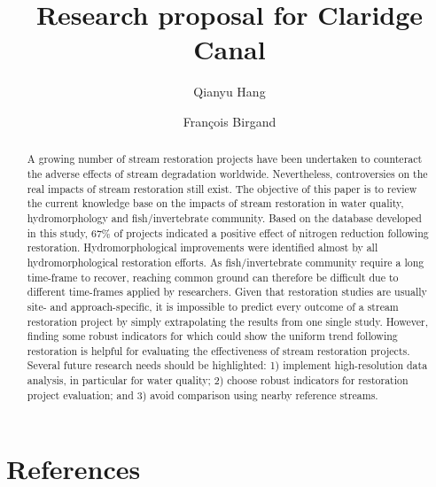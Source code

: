 \documentclass[]{elsarticle} %
\begin{document}
\begin{frontmatter}

  \title{Research proposal for Claridge Canal}
    \author[NC State University]{Qianyu Hang}
  
    \author[NC State University]{François Birgand}
      \address[NC State University]{Biological and Agricultural Engineering, Capus Box 7625, Raleigh, NC,
27695}
  
  \begin{abstract}
  A growing number of stream restoration projects have been undertaken to
  counteract the adverse effects of stream degradation worldwide.
  Nevertheless, controversies on the real impacts of stream restoration
  still exist. The objective of this paper is to review the current
  knowledge base on the impacts of stream restoration in water quality,
  hydromorphology and fish/invertebrate community. Based on the database
  developed in this study, 67\% of projects indicated a positive effect of
  nitrogen reduction following restoration. Hydromorphological
  improvements were identified almost by all hydromorphological
  restoration efforts. As fish/invertebrate community require a long
  time-frame to recover, reaching common ground can therefore be difficult
  due to different time-frames applied by researchers. Given that
  restoration studies are usually site- and approach-specific, it is
  impossible to predict every outcome of a stream restoration project by
  simply extrapolating the results from one single study. However, finding
  some robust indicators for which could show the uniform trend following
  restoration is helpful for evaluating the effectiveness of stream
  restoration projects. Several future research needs should be
  highlighted: 1) implement high-resolution data analysis, in particular
  for water quality; 2) choose robust indicators for restoration project
  evaluation; and 3) avoid comparison using nearby reference streams.
  \end{abstract}
  
 \end{frontmatter}

\hypertarget{references}{%
\section*{References}\label{references}}
\end{document}

